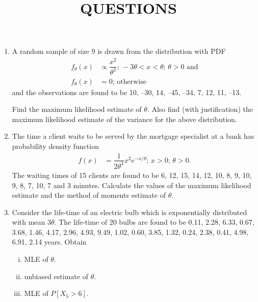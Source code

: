 \documentclass[11pt, a4paper]{article}
\title{\textbf{QUESTIONS}}
\author{}
\date{}
\begin{document}
\maketitle

\begin{enumerate}


	\item A random sample of size 9 is drawn from the distribution with PDF
	\begin{align*}
	f_{\theta}(x) &\propto \dfrac{x^2}{{\theta}^3}; \,  -3\theta < x < \theta; \, \theta > 0 \,\, \text{and} \\
	f_{\theta}(x) &= 0; \, \text{otherwise}
	\end{align*}
	and the observations are found to be 10, –30, 14, –45, –34, 7, 12, 11, –13.

Find the maximum likelihood estimate of $\theta$. Also find (with justification) the maximum likelihood estimate of the variance for the above distribution.





	\item The time a client waits to be served by the mortgage specialist at a bank has probability density function 
	\begin{align*}
	f(x) &= \dfrac{1}{2{\theta}^3} x^2 e^{-x/\theta}; \, x > 0; \, \theta > 0.
	\end{align*}
	The waiting times of 15 clients are found to be 6, 12, 15, 14, 12, 10, 8, 9, 10, 9, 8, 7, 10, 7 and 3 minutes. 
Calculate the values of the maximum likelihood estimate and the method of moments estimate of $\theta$. 










	\item Consider the life-time of an electric bulb which is exponentially distributed with mean $3\theta$. The life-time of 20 bulbs are found to be 0.11, 2.28, 6.33, 0.67, 3.68, 1.46, 4.17, 2.96, 4.93, 9.49, 1.02, 0.60, 3.85, 1.32, 0.24, 2.38, 0.41, 4.98, 6.91, 2.14 years. Obtain 
	\begin{enumerate}[(i)]
		\item MLE of $\theta$.
		\item unbiased estimate of $\theta$.
		\item MLE of $P\left[ X_5 > 6 \right]$.	
	\end{enumerate}
	

\end{enumerate}
\end{document}
